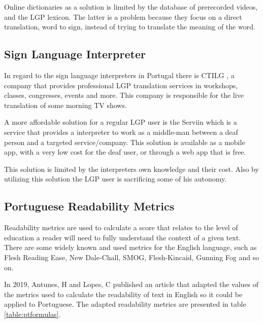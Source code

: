 \documentclass[runningheads]{llncs}
\begin{document}
Online dictionaries as a solution is limited by the database of prerecorded videos, and the LGP lexicon.
The latter is a problem because they focus on a direct translation, word to sign, instead of trying to translate the meaning of the word.

\subsection{Sign Language Interpreter}

In regard to the sign language interpreters in Portugal there is CTILG \cite{ctilg_2020}, a company that provides professional LGP translation services in workshops, classes, congresses, events and more.
This company is responsible for the live translation of some morning TV shows.

A more affordable solution for a regular LGP user is the Serviin \cite{serviin_2020} which is a service that provides a interpreter to work as a middle-man between a deaf person and a targeted service/company.
This solution is available as a mobile app, with a very low cost for the deaf user, or through a  web app that is free.

This solution is limited by the interpreters own knowledge and their cost.
Also by utilizing this solution the LGP user is sacrificing some of his autonomy.

\subsection{Portuguese Readability Metrics}

Readability metrics are used to calculate a score that relates to the level of education a reader will need to fully understand the context of a given text.
There are some widely known and used metrics for the English language, such as Flesh Reading Ease, New Dale-Chall, SMOG, Flesh-Kincaid, Gunning Fog and so on.

In 2019, Antunes, H and Lopes, C published an article \cite{ptread_2019} that adapted the values of the metrics used to calculate the readability of text in English so it could be applied to Portuguese.
The adapted readability metrics are presented in table \ref{table:ptformulas}.
\end{document}
